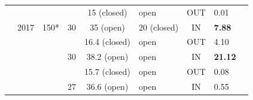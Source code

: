 \documentclass[encoding=utf8,british]{tumphthesis}
\begin{document}
\begin{table}[H]
\begin{tabular}{|c|c|c|l|c|l|c|l|r|}
\rowcolor[HTML]{EFEFEF} 
\cellcolor[HTML]{EFEFEF}                       & \cellcolor[HTML]{EFEFEF}                       & \cellcolor[HTML]{EFEFEF}                                           & \multicolumn{1}{|c|}{\cellcolor[HTML]{9FC5E8}}                     & 15 (closed)                       & open                                & OUT                        & 0.01                          \\
\rowcolor[HTML]{9FC5E8} 
\cellcolor[HTML]{EFEFEF}                       & \multirow{-4}{*}{\cellcolor[HTML]{EFEFEF}2017} & \multirow{-4}{*}{\cellcolor[HTML]{EFEFEF}150*}                     & \multicolumn{1}{c|}{\multirow{-2}{*}{\cellcolor[HTML]{9FC5E8}30}} & 35 (open)                         & 20 (closed)                         & IN                         & \textbf{7.88}                 \\
\rowcolor[HTML]{EFEFEF} 
\cellcolor[HTML]{EFEFEF}                       & \cellcolor[HTML]{9FC5E8}                       & \multicolumn{1}{c}{\cellcolor[HTML]{9FC5E8}}                       & \cellcolor[HTML]{EFEFEF}                                         & 16.4 (closed)                     & open                                & OUT                        & 4.10                          \\
\rowcolor[HTML]{9FC5E8} 
\cellcolor[HTML]{EFEFEF}                       & \cellcolor[HTML]{9FC5E8}                       & \multicolumn{1}{|c}{\cellcolor[HTML]{9FC5E8}}                       & \multirow{-2}{*}{\cellcolor[HTML]{EFEFEF}30}                     & 38.2 (open)                       & open                                & IN                         & \textbf{21.12}                \\
\rowcolor[HTML]{EFEFEF} 
\cellcolor[HTML]{EFEFEF}                       & \cellcolor[HTML]{9FC5E8}                       & \multicolumn{1}{c}{\cellcolor[HTML]{9FC5E8}}                       & \multicolumn{1}{|c|}{\cellcolor[HTML]{9FC5E8}}                     & 15.7 (closed)                     & open                                & OUT                        & 0.08                          \\
\rowcolor[HTML]{9FC5E8} 
\cellcolor[HTML]{EFEFEF}                       & \cellcolor[HTML]{9FC5E8}                       & \multicolumn{1}{|c|}{\cellcolor[HTML]{9FC5E8}}                       & \multicolumn{1}{|c|}{\multirow{-2}{*}{\cellcolor[HTML]{9FC5E8}27}} & 36.6 (open)                       & open                                & IN                         & 0.55                          \\

\end{tabular}
\end{table}
\end{document}
